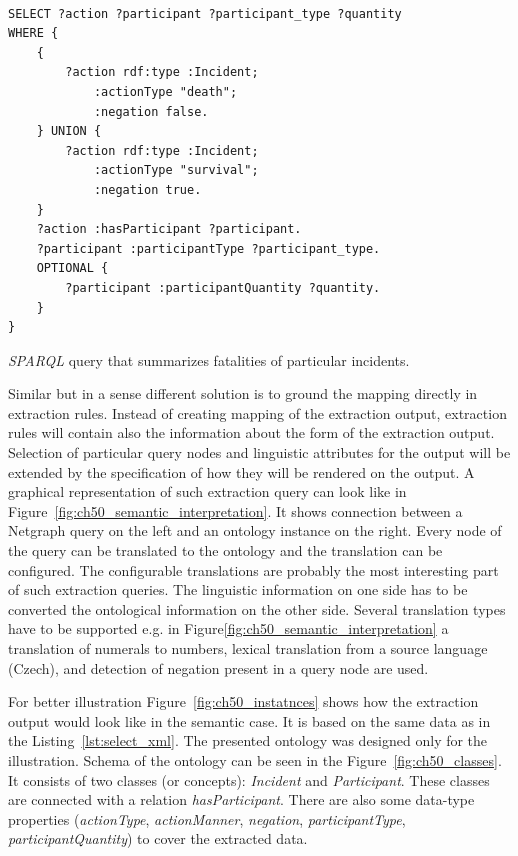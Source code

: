 \begin{listing}[ht]
\begin{verbatim}

SELECT ?action ?participant ?participant_type ?quantity
WHERE {
	{
		?action rdf:type :Incident;
			:actionType "death";
			:negation false.
	} UNION {
		?action rdf:type :Incident;
			:actionType "survival";
			:negation true.
	}
	?action :hasParticipant ?participant.
	?participant :participantType ?participant_type.
	OPTIONAL {
		?participant :participantQuantity ?quantity.
	}
}
\end{verbatim}
\caption{\emph{SPARQL} query that summarizes fatalities of particular incidents.}
\label{lst:sparql_aggregation}
\end{listing}



Similar but in a sense different solution is to ground the mapping directly in extraction rules. Instead of creating mapping of the extraction output, extraction rules will contain also the information about the form of the extraction output. Selection of particular query nodes and linguistic attributes for the output will be extended by the specification of how they will be rendered on the output. A graphical representation of such extraction query can look like in Figure~\ref{fig:ch50_semantic_interpretation}. It shows connection between a Netgraph query on the left and an ontology instance on the right. Every node of the query can be translated to the ontology and the translation can be configured. The configurable translations are probably the most interesting part of such extraction queries. The linguistic information on one side has to be converted the ontological information on the other side. Several translation types have to be supported e.g. in Figure\ref{fig:ch50_semantic_interpretation} a translation of numerals to numbers, lexical translation from a source language (Czech), and detection of negation present in a query node are used.

For better illustration Figure~\ref{fig:ch50_instatnces} shows how the extraction output would look like in the semantic case. It is based on the same data as in the Listing~\ref{lst:select_xml}. The presented ontology was designed only for the illustration. Schema of the ontology can be seen in the Figure~\ref{fig:ch50_classes}. It consists of two classes (or concepts): \emph{Incident} and \emph{Participant}. These classes are connected with a relation \emph{hasParticipant}. There are also some data-type properties (\emph{actionType}, \emph{actionManner}, \emph{negation}, \emph{participantType}, \emph{participantQuantity}) to cover the extracted data. 

